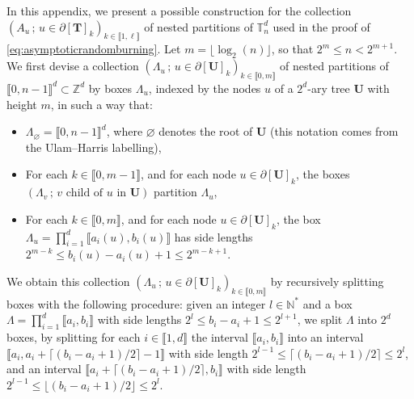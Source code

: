 \documentclass[a4paper,11pt]{article}
\begin{document}
In this appendix, we present a possible construction for the collection $(A_u\,;\,u\in\partial[\mathbf{T}]_k)_{k\in\llbracket1,\ell\rrbracket}$ of nested partitions of $\mathbb{T}_n^d$ used in the proof of \eqref{eq:asymptoticrandomburning}.
Let $m=\lfloor\log_2(n)\rfloor$, so that $2^m\leq n<2^{m+1}$.
We first devise a collection $(\Lambda_u\,;\,u\in\partial[\mathbf{U}]_k)_{k\in\llbracket0,m\rrbracket}$ of nested partitions of $\llbracket0,n-1\rrbracket^d\subset\mathbb{Z}^d$ by boxes $\Lambda_u$, indexed by the nodes $u$ of a $2^d$-ary tree $\mathbf{U}$ with height $m$, in such a way that:
\begin{itemize}
\item $\Lambda_\varnothing=\llbracket0,n-1\rrbracket^d$, where $\varnothing$ denotes the root of $\mathbf{U}$ (this notation comes from the Ulam--Harris labelling),

\item For each $k\in\llbracket0,m-1\rrbracket$, and for each node $u\in\partial[\mathbf{U}]_k$, the boxes $(\Lambda_v\,;\,\text{$v$ child of $u$ in $\mathbf{U}$})$ partition $\Lambda_u$,

\item For each $k\in\llbracket0,m\rrbracket$, and for each node $u\in\partial[\mathbf{U}]_k$, the box $\Lambda_u=\prod_{i=1}^d\llbracket a_i(u),b_i(u)\rrbracket$ has side lengths $2^{m-k}\leq b_i(u)-a_i(u)+1\leq2^{m-k+1}$.
\end{itemize}
We obtain this collection $(\Lambda_u\,;\,u\in\partial[\mathbf{U}]_k)_{k\in\llbracket0,m\rrbracket}$ by recursively splitting boxes with the following procedure: given an integer $l\in\mathbb{N}^*$ and a box $\Lambda=\prod_{i=1}^d\llbracket a_i,b_i\rrbracket$ with side lengths ${2^l\leq b_i-a_i+1\leq2^{l+1}}$, we split $\Lambda$ into $2^d$ boxes, by splitting for each $i\in\llbracket1,d\rrbracket$ the interval $\llbracket a_i,b_i\rrbracket$ into an interval $\llbracket a_i,a_i+\lceil(b_i-a_i+1)/2\rceil-1\rrbracket$ with side length $2^{l-1}\leq\lceil(b_i-a_i+1)/2\rceil\leq2^l$, and an interval $\llbracket a_i+\lceil(b_i-a_i+1)/2\rceil,b_i\rrbracket$ with side length $2^{l-1}\leq\lfloor(b_i-a_i+1)/2\rfloor\leq2^l$.
\end{document}
